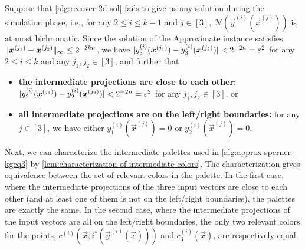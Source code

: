 Suppose that \cref{alg:recover-2d-sol} fails to give us any solution during the simulation phase, i.e., for any $2\leq i\leq k-1$ and $j\in [3]$, $\mathcal{N}(\vec{y}^{(i)}(\vec{x}^{(j)}))$ is at most bichromatic. 
Since the solution of the \outofk Approximate \Sperner instance satisfies $\| {\boldsymbol{x}^{(j_1)}-\boldsymbol{x}^{(j_2)}} \|_{\infty}\leq 2^{-3kn}$, we have $|{y_3^{(i)}(\boldsymbol{x}^{(j_1)})-y_3^{(i)}(\boldsymbol{x}^{(j_2)})} | < 2^{-2n}=\varepsilon^2$ for any $2\leq i\leq k$ and any $j_1,j_2\in [3]$, and further that
\begin{itemize}[itemsep=0.2em, topsep=0.5em]
    \item {\bf the intermediate projections are close to each other:} $|{y_2^{(i)}(\boldsymbol{x}^{(j_1)})-y_2^{(i)}(\boldsymbol{x}^{(j_2)})} |<2^{-2n}=\varepsilon^2$ for any $j_1,j_2\in [3]$, or
    \item {\bf all intermediate projections are on the left/right boundaries:} for any $j\in [3]$, we have either $y_1^{(i)}(\vec{x}^{(j)})=0$ or $y_2^{(i)}(\vec{x}^{(j)})=0$.
\end{itemize}

Next, we can characterize the intermediate palettes used in \cref{alg:approx-sperner-kgeq3} by \cref{lem:characterization-of-intermediate-colors}.
The characterization gives equivalence between the set of relevant colors in the palette.
In the first case, where the intermediate projections of the three input vectors are close to each other (and at least one of them is not on the left/right boundaries), the palettes are exactly the same.
In the second case, where the intermediate projections of the input vectors are all on the left/right boundaries, the only two relevant colors for the points, $c^{(i)}(\vec{x}, i^*(\vec{y}^{(i)}(\vec{x})))$ and $c^{(i)}_3(\vec{x})$, are respectively equal. 

